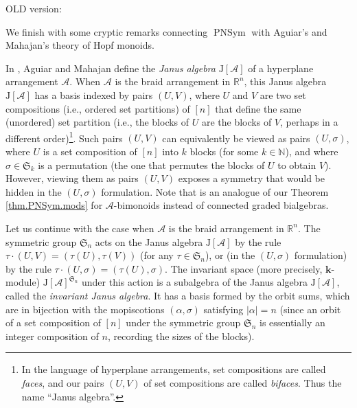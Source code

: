 \documentclass[numbers=enddot,12pt,final,onecolumn,notitlepage]{scrartcl}%
\theoremstyle{definition}
\newenvironment{noncompile}{}{}
\begin{document}
\begin{noncompile}
OLD version:

We finish with some cryptic remarks connecting $\operatorname*{PNSym}$ with
Aguiar's and Mahajan's theory of Hopf monoids.

In \cite[\S 1.9.3]{AguMah20}, Aguiar and Mahajan define the \emph{Janus
algebra} $\mathrm{J}\left[  \mathcal{A}\right]  $ of a hyperplane arrangement
$\mathcal{A}$. When $\mathcal{A}$ is the braid arrangement in $\mathbb{R}^{n}%
$, this Janus algebra $\mathrm{J}\left[  \mathcal{A}\right]  $ has a basis
indexed by pairs $\left(  U,V\right)  $, where $U$ and $V$ are two set
compositions (i.e., ordered set partitions) of $\left[  n\right]  $ that
define the same (unordered) set partition (i.e., the blocks of $U$ are the
blocks of $V$, perhaps in a different order)\footnote{In the language of
hyperplane arrangements, set compositions are called \emph{faces}, and our
pairs $\left(  U,V\right)  $ of set compositions are called \emph{bifaces}.
Thus the name \textquotedblleft Janus algebra\textquotedblright.}. Such pairs
$\left(  U,V\right)  $ can equivalently be viewed as pairs $\left(
U,\sigma\right)  $, where $U$ is a set composition of $\left[  n\right]  $
into $k$ blocks (for some $k\in\mathbb{N}$), and where $\sigma\in
\mathfrak{S}_{k}$ is a permutation (the one that permutes the blocks of $U$ to
obtain $V$). However, viewing them as pairs $\left(  U,V\right)  $ exposes a
symmetry that would be hidden in the $\left(  U,\sigma\right)  $ formulation.
Note that \cite[Proposition 11.6]{AguMah20} is an analogue of our Theorem
\ref{thm.PNSym.mods} for $\mathcal{A}$-bimonoids instead of connected graded bialgebras.

Let us continue with the case when $\mathcal{A}$ is the braid arrangement in
$\mathbb{R}^{n}$. The symmetric group $\mathfrak{S}_{n}$ acts on the Janus
algebra $\mathrm{J}\left[  \mathcal{A}\right]  $ by the rule $\tau\cdot\left(
U,V\right)  =\left(  \tau\left(  U\right)  ,\tau\left(  V\right)  \right)  $
(for any $\tau\in\mathfrak{S}_{n}$), or (in the $\left(  U,\sigma\right)  $
formulation) by the rule $\tau\cdot\left(  U,\sigma\right)  =\left(
\tau\left(  U\right)  ,\sigma\right)  $. The invariant space (more precisely,
$\mathbf{k}$-module) $\mathrm{J}\left[  \mathcal{A}\right]  ^{\mathfrak{S}%
_{n}}$ under this action is a subalgebra of the Janus algebra $\mathrm{J}%
\left[  \mathcal{A}\right]  $, called the \emph{invariant Janus algebra}. It
has a basis formed by the orbit sums, which are in bijection with the
mopiscotions $\left(  \alpha,\sigma\right)  $ satisfying $\left\vert
\alpha\right\vert =n$ (since an orbit of a set composition of $\left[
n\right]  $ under the symmetric group $\mathfrak{S}_{n}$ is essentially an
integer composition of $n$, recording the sizes of the blocks).


\end{noncompile}
\end{document}
